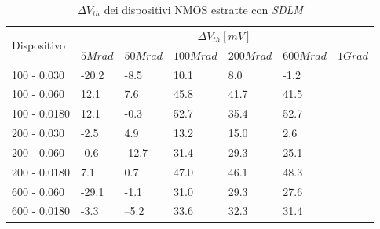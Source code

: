 \documentclass[12pt, letterpaper]{book}
\begin{document}
\begin{table}[H]
  \renewcommand{\arraystretch}{1.3}
  \begin{tabular}{m{2.1cm}  m{1.1cm} m{1.3cm} m{1.5cm} m{1.5cm} m{1.5cm} m{1cm}}
    \toprule
    \multirow{2}{*}{Dispositivo} & \multicolumn{6}{c}{$\Delta V_{th} [mV] $}                                                          \\
    \cmidrule{2-7}
                                 & $5Mrad$                                   & $50Mrad$ & $100Mrad$ & $200Mrad$ & $600Mrad$ & $1Grad$ \\
    \midrule
    100 - 0.030                     & -20.2                                     & -8.5     & 10.1      & 8.0       & -1.2      &         \\
    \hline
    100 - 0.060                     & 12.1                                      & 7.6      & 45.8      & 41.7      & 41.5      &         \\
    \hline
    100 - 0.0180                    & 12.1                                      & -0.3     & 52.7      & 35.4      & 52.7      &         \\
    \hline
    200 - 0.030                     & -2.5                                      & 4.9      & 13.2      & 15.0      & 2.6       &         \\
    \hline
    200 - 0.060                     & -0.6                                      & -12.7    & 31.4      & 29.3      & 25.1      &         \\
    \hline
    200 - 0.0180                    & 7.1                                       & 0.7      & 47.0      & 46.1      & 48.3      &         \\
    \hline
    600 - 0.060                     & -29.1                                     & -1.1     & 31.0      & 29.3      & 27.6      &         \\
    \hline
    600 - 0.0180                    & -3.3                                      & --5.2    & 33.6      & 32.3      & 31.4      &         \\
    \bottomrule
  \end{tabular}
  \caption{$\Delta V_{th}$ dei dispositivi NMOS estratte con \emph{SDLM}}
  \label{tab:deltaVthSDLMN}
\end{table}
\end{document}
